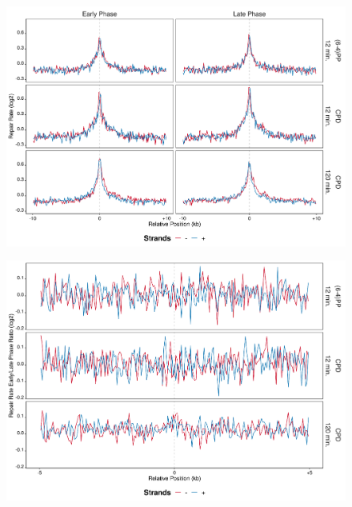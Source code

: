 \begin{figure}[H]
\begin{center}
\includegraphics[width=\textwidth]{Chapters/7_appendix/figures/supfig53}
\caption[]{}
\label{supfig:}
\end{center}
\end{figure}

\begin{figure}[H]
\begin{center}
\includegraphics[width=\textwidth]{Chapters/7_appendix/figures/supfig54}
\caption[]{}
\label{supfig:}
\end{center}
\end{figure}

